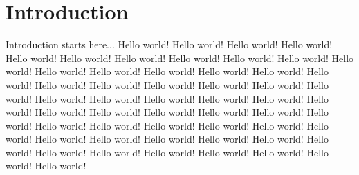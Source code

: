 \chapter{Introduction}
\label{chap:intro}

Introduction starts here... Hello world! Hello world! Hello world! Hello world! Hello world! Hello world! Hello world! Hello world! Hello world! Hello world! Hello world! Hello world! Hello world! Hello world! Hello world! Hello world! Hello world! Hello world! Hello world! Hello world! Hello world! Hello world! Hello world! Hello world! Hello world! Hello world! Hello world! Hello world! Hello world! Hello world! Hello world! Hello world! Hello world! Hello world! Hello world! Hello world! Hello world! Hello world! Hello world! Hello world! Hello world! Hello world! Hello world! Hello world! Hello world! Hello world! Hello world! Hello world! Hello world! Hello world! Hello world! Hello world! Hello world! Hello world! 
